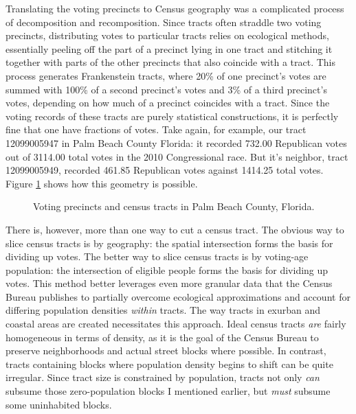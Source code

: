 \documentclass[12pt,oneside]{psthesis}
\begin{document}
Translating the voting precincts to Census geography was a complicated process of decomposition and recomposition.
Since tracts often straddle two voting precincts, distributing votes to particular tracts relies on ecological methods, essentially peeling off the part of a precinct lying in one tract and stitching it together with parts of the other precincts that also coincide with a tract.
This process generates Frankenstein tracts, where 20\% of one precinct's votes are summed with 100\% of a second precinct's votes and 3\% of a third precinct's votes, depending on how much of a precinct coincides with a tract.
Since the voting records of these tracts are purely statistical constructions, it is perfectly fine that one have fractions of votes.
Take again, for example, our tract 12099005947 in Palm Beach County Florida: it recorded 732.00 Republican votes out of 3114.00 total votes in the 2010 Congressional race.
But it's neighbor, tract 12099005949, recorded 461.85 Republican votes against 1414.25 total votes.
Figure \ref{fig:palmbeach} shows how this geometry is possible.
\begin{figure}

{\centering {}

}

\caption{Voting precincts and census tracts in Palm Beach County, Florida.}\label{fig:palmbeach}
\end{figure}
There is, however, more than one way to cut a census tract.
The obvious way to slice census tracts is by geography: the spatial intersection forms the basis for dividing up votes.
The better way to slice census tracts is by voting-age population: the intersection of eligible people forms the basis for dividing up votes.
This method better leverages even more granular data that the Census Bureau publishes to partially overcome ecological approximations and account for differing population densities \emph{within} tracts.
The way tracts in exurban and coastal areas are created necessitates this approach.
Ideal census tracts \emph{are} fairly homogeneous in terms of density, as it is the goal of the Census Bureau to preserve neighborhoods and actual street blocks where possible.
In contrast, tracts containing blocks where population density begins to shift can be quite irregular.
Since tract size is constrained by population, tracts not only \emph{can} subsume those zero-population blocks I mentioned earlier, but \emph{must} subsume some uninhabited blocks.
\end{document}
